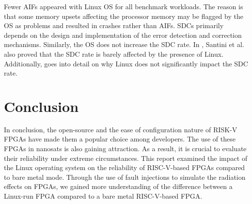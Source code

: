 \documentclass[conference]{IEEEtran}
\begin{document}
Fewer AIFs appeared with Linux OS for all benchmark workloads. The reason is that some memory upsets affecting the processor memory 
may be flagged by the OS as problems and resulted in crashes rather than AIFs. SDCs primarily depends on the design and implementation of the error 
detection and correction mechanisms. Similarly, the OS does not increase the SDC rate. In \cite{b7}, Santini et al. also proved that the SDC 
rate is barely affected by the presence of Linux. Additionally, \cite{b4} goes into detail on why Linux does not significantly impact the SDC rate. 

\section{Conclusion}
In conclusion, the open-source and the ease of configuration nature of RISK-V FPGAs have made them a popular choice among developers. 
The use of these FPGAs in nanosats is also gaining attraction. As a result, it is crucial to evaluate their reliability under extreme 
circumstances. This report examined the impact of the Linux operating system on the reliability of RISC-V-based FPGAs compared 
to bare metal mode. Through the use of fault injections to simulate the radiation effects on FPGAs, we gained more understanding of 
the difference between a Linux-run FPGA compared to a bare metal RISC-V-based FPGA. 
\end{document}
